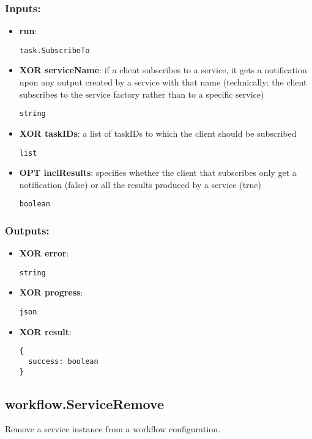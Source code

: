 \subsubsection*{Inputs:}
\begin{itemize}
    \item \textbf{run}: 
\begin{lstlisting}
task.SubscribeTo
\end{lstlisting}
    \item \textbf{XOR serviceName}: if a client subscribes to a service, it gets a notification upon any  output created by a service with that name (technically: the client  subscribes to the service factory rather than to a specific service)
\begin{lstlisting}
string
\end{lstlisting}
    \item \textbf{XOR taskIDs}: a list of taskIDs to which the client should be subscribed
\begin{lstlisting}
list
\end{lstlisting}
    \item \textbf{OPT inclResults}: specifies whether the client that subscribes only get a notification (false) or all the results produced by a service (true)
\begin{lstlisting}
boolean
\end{lstlisting}
  \end{itemize}

\subsubsection*{Outputs:}
\begin{itemize}
    \item \textbf{XOR error}: 
\begin{lstlisting}
string
\end{lstlisting}
    \item \textbf{XOR progress}: 
\begin{lstlisting}
json
\end{lstlisting}
    \item \textbf{XOR result}: 
\begin{lstlisting}
{
  success: boolean
}
\end{lstlisting}
  \end{itemize}

\subsection{workflow.ServiceRemove}
\label{ch:builtinservices:workflow.ServiceRemove}
Remove a service instance from a workflow configuration.
